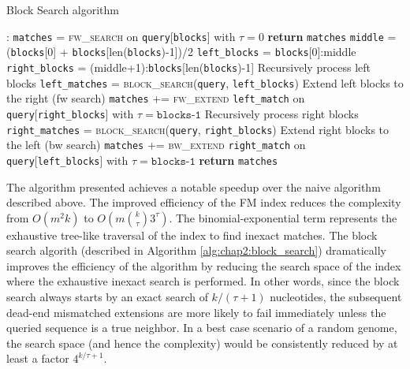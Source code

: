 \begin{algorithm}
  \caption{Block Search algorithm}
  \label{alg:chap2:block_search}
  \begin{algorithmic}[1]
    :
     
    \State \texttt{matches} = \textsc{fw\_search} on \texttt{query}[\texttt{blocks}] with $\tau=0$
    \State \textbf{return} \texttt{matches}
    \EndIf
    \State {}
    \State \texttt{middle} = (\texttt{blocks}[0] +
    \texttt{blocks}[len(\texttt{blocks})-1])/2
    \State \texttt{left\_blocks} = \texttt{blocks}[0]:middle
    \State \texttt{right\_blocks} = (middle+1):\texttt{blocks}[len(\texttt{blocks})-1]
    \State \Comment Recursively process left blocks
    \State \texttt{left\_matches} = \textsc{block\_search}(\texttt{query}, \texttt{left\_blocks})
    \State \Comment Extend left blocks to the right (fw search)
    \State \texttt{matches} += \textsc{fw\_extend} \texttt{left\_match} on
    \texttt{query}[\texttt{right\_blocks}] with
    $\tau=\texttt{blocks-1}$
    \EndFor
    \State \Comment Recursively process right blocks
    \State \texttt{right\_matches} = \textsc{block\_search}(\texttt{query}, \texttt{right\_blocks})
    \State \Comment Extend right blocks to the left (bw search)
    \State \texttt{matches} += \textsc{bw\_extend} \texttt{right\_match} on
    \texttt{query}[\texttt{left\_blocks}] with
    $\tau=\texttt{blocks-1}$
    \EndFor
    \State \textbf{return} \texttt{matches}
    \EndFunction
  \end{algorithmic}
\end{algorithm}

The algorithm presented achieves a notable speedup over the naive
algorithm described above. The improved efficiency of the FM index
reduces the complexity from $O(m^2k)$ to
$O(m{{k}\choose{\tau}}3^\tau)$. The binomial-exponential term 
represents the exhaustive tree-like traversal of the index to find
inexact matches. The block search algorith (described in Algorithm
\ref{alg:chap2:block_search}) dramatically improves the efficiency of
the algorithm by reducing the search space of the index where the
exhaustive inexact search is performed. In other words, since the
block search always starts by an exact search of $k/(\tau+1)$
nucleotides, the subsequent dead-end mismatched extensions are more
likely to fail immediately unless the queried sequence is a true
neighbor. In a best case scenario of a random genome, the search space
(and hence the complexity) would be consistently reduced by at least a
factor $4^{k/{\tau+1}}$. 

